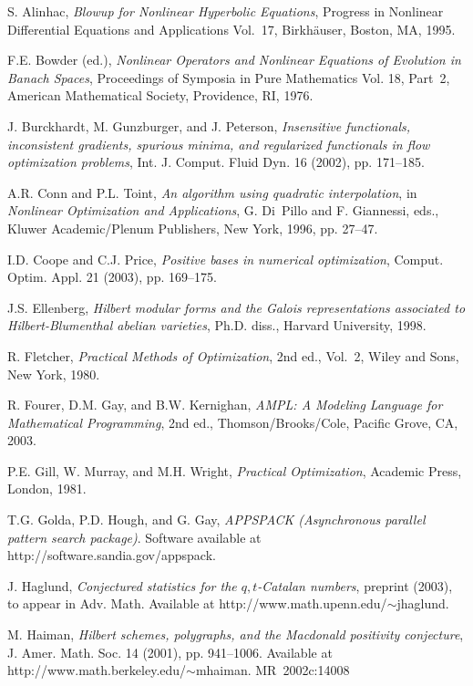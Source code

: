 \documentclass[]{interact}
\theoremstyle{plain}%
\theoremstyle{definition}
\theoremstyle{remark}
\begin{document}
\begin{thebibliography}{99}

S. Alinhac, \emph{Blowup for Nonlinear Hyperbolic Equations}, Progress in
  Nonlinear Differential Equations and Applications Vol.~17, Birkh{\"a}user,
  Boston, MA, 1995.

F.E. Bowder (ed.), \emph{Nonlinear Operators and Nonlinear Equations of
  Evolution in Banach Spaces}, Proceedings of Symposia in Pure Mathematics
  Vol. 18, Part~2, American Mathematical Society, Providence, RI, 1976.

J. Burckhardt, M. Gunzburger, and J. Peterson, \emph{Insensitive functionals,
  inconsistent gradients, spurious minima, and regularized functionals in flow
  optimization problems}, Int. J. Comput. Fluid Dyn. 16 (2002), pp. 171--185.

A.R. Conn and P.L. Toint, \emph{An algorithm using quadratic interpolation}, in
  \emph{Nonlinear Optimization and Applications}, G. Di~Pillo and F. Giannessi,
  eds., Kluwer Academic/Plenum Publishers, New York, 1996, pp. 27--47.

I.D. Coope and C.J. Price, \emph{Positive bases in numerical optimization},
  Comput. Optim. Appl. 21 (2003), pp. 169--175.

J.S. Ellenberg, \emph{Hilbert modular forms and the Galois representations
  associated to Hilbert-Blumenthal abelian varieties}, Ph.D. diss., Harvard
  University, 1998.

R. Fletcher, \emph{Practical Methods of Optimization}, 2nd ed., Vol.~2, Wiley
  and Sons, New York, 1980.

R. Fourer, D.M. Gay, and B.W. Kernighan, \emph{AMPL: A Modeling Language for
  Mathematical Programming}, 2nd ed., Thomson/Brooks/Cole, Pacific Grove, CA,
  2003.

P.E. Gill, W. Murray, and M.H. Wright, \emph{Practical Optimization}, Academic
  Press, London, 1981.

T.G. Golda, P.D. Hough, and G. Gay, \emph{APPSPACK (Asynchronous parallel
  pattern search package)}. Software available at
  http://software.sandia.gov/appspack.

J. Haglund, \emph{Conjectured statistics for the {$q,t$}-Catalan numbers},
  preprint (2003), to appear in Adv. Math. Available at
  http://www.math.upenn.edu/$\sim$jhaglund.

M. Haiman, \emph{Hilbert schemes, polygraphs, and the Macdonald positivity
  conjecture}, J. Amer. Math. Soc. 14 (2001), pp. 941--1006. Available at
  http://www.math.berkeley.edu/$\sim$mhaiman. MR~2002c:14008


\end{thebibliography}
\end{document}
